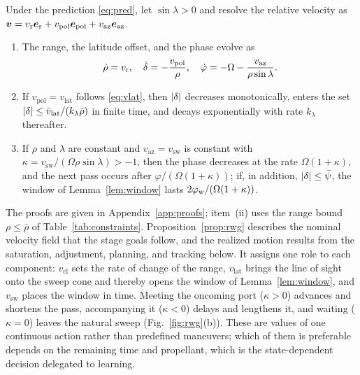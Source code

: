 \begin{proposition}\label{prop:rwg}
Under the prediction \eqref{eq:pred}, let $\sin\lambda>0$ and resolve the relative velocity as $\boldsymbol{v}=v_{\mathrm{r}}\boldsymbol{e}_{\mathrm{r}}+v_{\mathrm{pol}}\boldsymbol{e}_{\mathrm{pol}}+v_{\mathrm{az}}\boldsymbol{e}_{\mathrm{az}}$.
\begin{enumerate}
\item[(i)] The range, the latitude offset, and the phase evolve as
\begin{equation}\label{eq:localkin}
\dot\rho=v_{\mathrm{r}},\quad \dot{\delta}=-\frac{v_{\mathrm{pol}}}{\rho},\quad \dot\varphi=-\Omega-\frac{v_{\mathrm{az}}}{\rho\sin\lambda}.
\end{equation}
\item[(ii)] If $v_{\mathrm{pol}}=v_{\mathrm{lat}}$ follows \eqref{eq:vlat}, then $|\delta|$ decreases monotonically, enters the set $|\delta|\le\bar v_{\mathrm{lat}}/(k_{\lambda}\bar\rho)$ in finite time, and decays exponentially with rate $k_{\lambda}$ thereafter.
\item[(iii)] If $\rho$ and $\lambda$ are constant and $v_{\mathrm{az}}=v_{\mathrm{sw}}$ is constant with $\kappa=v_{\mathrm{sw}}/(\Omega\rho\sin\lambda)>-1$, then the phase decreases at the rate $\Omega(1+\kappa)$, and the next pass occurs after $\varphi/(\Omega(1+\kappa))$; if, in addition, $|\delta|\le\bar\psi$, the window of Lemma~\ref{lem:window} lasts $2\varphi_{\mathrm{w}}/(\Omega(1+\kappa))$.
\end{enumerate}
\end{proposition}

The proofs are given in Appendix~\ref{app:proofs}; item~(ii) uses the range bound $\rho\le\bar\rho$ of Table~\ref{tab:constraints}. Proposition~\ref{prop:rwg} describes the nominal velocity field that the stage goals follow, and the realized motion results from the saturation, adjustment, planning, and tracking below. It assigns one role to each component: $v_{\mathrm{cl}}$ sets the rate of change of the range, $v_{\mathrm{lat}}$ brings the line of sight onto the sweep cone and thereby opens the window of Lemma~\ref{lem:window}, and $v_{\mathrm{sw}}$ places the window in time. Meeting the oncoming port ($\kappa>0$) advances and shortens the pass, accompanying it ($\kappa<0$) delays and lengthens it, and waiting ($\kappa=0$) leaves the natural sweep (Fig.~\ref{fig:rwg}(b)). These are values of one continuous action rather than predefined maneuvers; which of them is preferable depends on the remaining time and propellant, which is the state-dependent decision delegated to learning.

